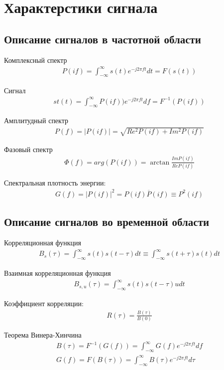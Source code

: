 \chapter{Характерстики сигнала}

\section{Описание сигналов в частотной области}

Комплексный спектр
\begin{align}
	P(if) = \int_{-\infty}^{\infty} s(t)e^{-j2\pi ft} dt = F(s(t))
\end{align}

Сигнал
\begin{align}
	st(t) = \int_{-\infty}^{\infty} P(if))e^{-j2\pi ft} df = F^{-1}(P(if))
\end{align}

Амплитудный спектр
\begin{align}
	P(f) = |P(if)| = \sqrt{Re^{2}P(if) + Im^{2}P(if)}
\end{align}

Фазовый спектр
\begin{align}
	\Phi(f) = arg(P(if)) = \arctan{\frac{ImP(if)}{ReP(if)}}
\end{align}

Спектральная плотность энергии:
\begin{align}
	G(f) = |P(if)|^{2} = P(if)\overline{P}(if) \equiv P^{2}(if)
\end{align}

\section{Описание сигналов во временной области}

Корреляционная функция 
\begin{align}
	B_{s}(\tau) = \int_{-\infty}^{\infty} s(t)s(t - \tau) dt \equiv \int_{-\infty}^{\infty} s(t + \tau)s(t) dt
\end{align}

Взаимная корреляционная функция
\begin{align}
	B_{s, u}(\tau) = \int_{-\infty}^{\infty} s(t)s(t - \tau)u dt
\end{align}

Коэффициент корреляции:
\begin{align}
	R(\tau) = \frac{B(\tau)}{B(0)}
\end{align}

Теорема Винера-Хинчина
\begin{align}
	B(\tau) = F^{-1}(G(f)) = \int_{-\infty}^{\infty} G(f)e^{-j2\pi ft} df \\
	G(f) = F(B(\tau)) = \int_{-\infty}^{\infty} B(\tau)e^{-j2\pi ft} d\tau \nonumber
\end{align}

